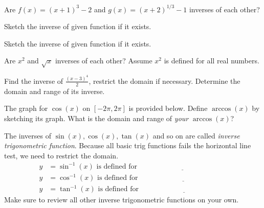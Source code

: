 \documentclass[../main.tex]{subfiles}
\begin{document}

\begin{example}
  Are \(f(x) = (x+1)^{3} - 2\) and \(g(x) = (x+2)^{1/3} - 1\) inverses of each other?

\end{example}

\begin{example}
  Sketch the inverse of given function if it exists.

  
  \quad
  
\end{example}

\begin{example}
  Sketch the inverse of given function if it exists.

  
  \quad
  
\end{example}
\clearpage
\begin{example}
  Are \(x^{2}\) and \(\sqrt{x}\) inverses of each other? Assume \(x^{2}\) is defined for all real numbers.

\end{example}

\begin{example}
  Find the inverse of \(\frac{(x - 3)^{4}}{2}\), restrict the domain if necessary.  Determine the domain and range of its inverse. 

\end{example}

\begin{example}
  The graph for \(\cos(x)\) on \([-2\pi, 2\pi]\) is provided below. Define \(\arccos(x)\) by sketching its graph. What is the domain and range of \emph{your} \(\arccos(x)\)?

  
\end{example}
\clearpage

The inverses of \(\sin(x), \cos(x), \tan(x)\) and so on are called \emph{inverse trigonometric function}. Because all basic trig functions fails the horizontal line test, we need to restrict the domain.
\medskip
\begin{align*}
  y &= \sin^{-1}(x) \text{ is defined for } \underline{\hspace{2in}} \\[3ex]
  y &= \cos^{-1}(x) \text{ is defined for } \underline{\hspace{2in}} \\[3ex]
  y &= \tan^{-1}(x) \text{ is defined for } \underline{\hspace{2in}}
\end{align*}
Make sure to review all other inverse trigonometric functions on your own.
\bigskip
\end{document}
